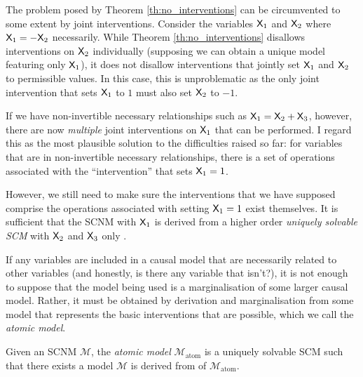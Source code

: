 
The problem posed by Theorem \ref{th:no_interventions} can be circumvented to some extent by joint interventions. Consider the variables $\mathsf{X}_1$ and $\mathsf{X}_2$ where $\mathsf{X}_1 = - \mathsf{X}_2$ necessarily. While Theorem \ref{th:no_interventions} disallows interventions on $\mathsf{X}_2$ individually (supposing we can obtain a unique model featuring only $\mathsf{X}_1$), it does not disallow interventions that jointly set $\mathsf{X}_1$ and $\mathsf{X}_2$ to permissible values. In this case, this is unproblematic as the only joint intervention that sets $\mathsf{X}_1$ to $1$ must also set $\mathsf{X}_2$ to $-1$.

If we have non-invertible necessary relationships such as $\mathsf{X}_1 = \mathsf{X}_2 + \mathsf{X}_3$, however, there are now \emph{multiple} joint interventions on $\mathsf{X}_1$ that can be performed. I regard this as the most plausible solution to the difficulties raised so far: for variables that are in non-invertible necessary relationships, there is a set of operations associated with the ``intervention'' that sets $\mathsf{X}_1=1$.

However, we still need to make sure the interventions that we have supposed comprise the operations associated with setting $\mathsf{X}_1=1$ exist themselves. It is sufficient that the SCNM with $\mathsf{X}_1$ is derived from a higher order \emph{uniquely solvable SCM} with $\mathsf{X}_2$ and $\mathsf{X}_3$ only .


If any variables are included in a causal model that are necessarily related to other variables (and honestly, is there any variable that isn't?), it is not enough to suppose that the model being used is a marginalisation of some larger causal model. Rather, it must be obtained by derivation and marginalisation from some model that represents the basic interventions that are possible, which we call the \emph{atomic model}.

\begin{definition}
Given an SCNM $\mathcal{M}$, the \emph{atomic model} $\mathcal{M}_{\text{atom}}$ is a uniquely solvable SCM such that there exists a model $\mathcal{M}$ is derived from of $\mathcal{M}_{\text{atom}}$.
\end{definition}

